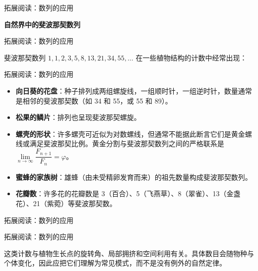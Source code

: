 \documentclass[aspectratio=169,10pt,fontset=fandol]{ctexbeamer}
\begin{document}
\begin{frame}[t,fragile]{拓展阅读：数列的应用}
\footnotesize
{\footnotesize
\textbf{自然界中的斐波那契数列}


}
\end{frame}
\begin{frame}[t,fragile]{拓展阅读：数列的应用}
\footnotesize
{\footnotesize
斐波那契数列 \(1, 1, 2, 3, 5, 8, 13, 21, 34, 55, \ldots\) 在一些植物结构的计数中经常出现：


}
\end{frame}
\begin{frame}[t,fragile]{拓展阅读：数列的应用}
\footnotesize
{\footnotesize
\begin{itemize}
\item \textbf{向日葵的花盘}：种子排列成两组螺旋线，一组顺时针，一组逆时针，数量通常是相邻的斐波那契数（如 34 和 55，或 55 和 89）。
\item \textbf{松果的鳞片}：排列也呈现斐波那契螺旋。
\item \textbf{螺壳的形状}：许多螺壳可近似为对数螺线，但通常不能据此断言它们是黄金螺线或满足斐波那契比例。黄金分割与斐波那契数列之间的严格联系是 \(\lim\limits_{n \to \infty} \dfrac{F_{n+1}}{F_n}=\varphi\)。
\item \textbf{蜜蜂的家族树}：雄蜂（由未受精卵发育而来）的祖先数量构成斐波那契数列。
\item \textbf{花瓣数}：许多花的花瓣数是 3（百合）、5（飞燕草）、8（翠雀）、13（金盏花）、21（紫菀）等斐波那契数。
\end{itemize}
}
\end{frame}
\begin{frame}[t,fragile]{拓展阅读：数列的应用}
\footnotesize
{\footnotesize
\begin{center}
\end{center}
}
\end{frame}
\begin{frame}[t,fragile]{拓展阅读：数列的应用}
\footnotesize
{\footnotesize
这类计数与植物生长点的旋转角、局部拥挤和空间利用有关。具体数目会随物种与个体变化，因此应把它们理解为常见模式，而不是没有例外的自然定律。


}
\end{frame}
\end{document}
